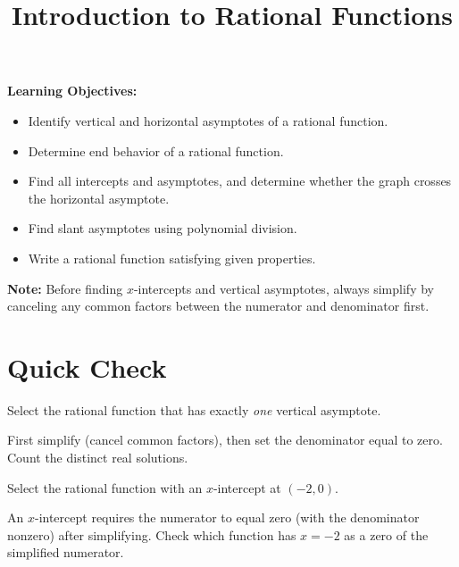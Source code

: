 \documentclass{ximera}
\title{Introduction to Rational Functions}
\begin{document}
\begin{abstract}
\end{abstract}
\maketitle

\textbf{Learning Objectives:}
\begin{itemize}
  \item Identify vertical and horizontal asymptotes of a rational function.
  \item Determine end behavior of a rational function.
  \item Find all intercepts and asymptotes, and determine whether the graph crosses the horizontal asymptote.
  \item Find slant asymptotes using polynomial division.
  \item Write a rational function satisfying given properties.
\end{itemize}
\medskip

\noindent\textbf{Note:} Before finding $x$-intercepts and vertical asymptotes, always simplify by canceling any common factors between the numerator and denominator first.

\bigskip
\section*{Quick Check}

\begin{problem}
Select the rational function that has exactly \emph{one} vertical asymptote.
\begin{hint}
First simplify (cancel common factors), then set the denominator equal to zero. Count the distinct real solutions.
\end{hint}
\begin{multipleChoice}
\end{multipleChoice}
\end{problem}

\begin{problem}
Select the rational function with an $x$-intercept at $(-2,0)$.
\begin{hint}
An $x$-intercept requires the numerator to equal zero (with the denominator nonzero) after simplifying. Check which function has $x=-2$ as a zero of the simplified numerator.
\end{hint}
\begin{multipleChoice}
\end{multipleChoice}
\end{problem}
\end{document}
